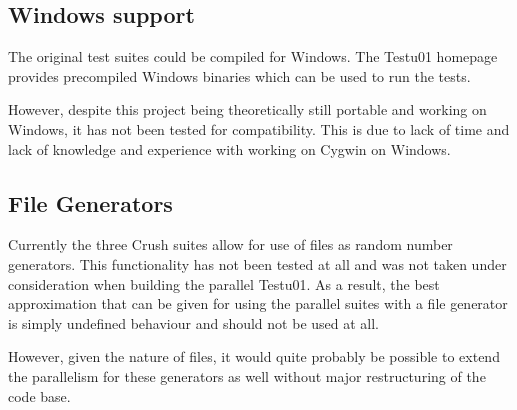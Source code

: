 \subsection{Windows support}
The original test suites could be compiled for Windows. The Testu01 homepage provides precompiled Windows binaries which can be used to run the tests.

However, despite this project being theoretically still portable and working on Windows, it has not been tested for compatibility. This is due to lack of time and lack of knowledge and experience with working on Cygwin on Windows.

\subsection{File Generators}
Currently the three Crush suites allow for use of files as random number generators. This functionality has not been tested at all and was not taken under consideration when building the parallel Testu01. As a result, the best approximation that can be given for using the parallel suites with a file generator is simply undefined behaviour and should not be used at all.

However, given the nature of files, it would quite probably be possible to extend the parallelism for these generators as well without major restructuring of the code base.
